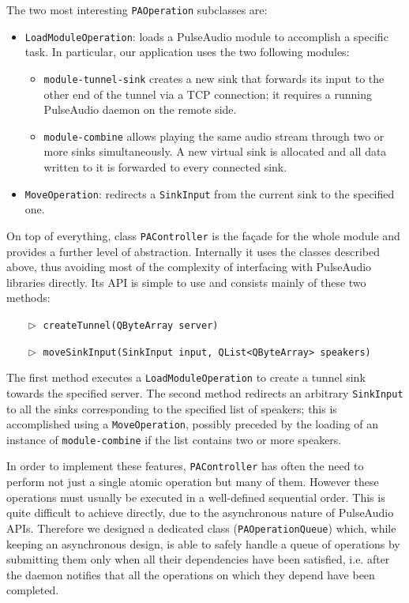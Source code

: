 \documentclass[conference]{IEEEtran}
\begin{document}
The two most interesting \texttt{PAOperation} subclasses are:
\begin{itemize}
	\item \texttt{LoadModuleOperation}: loads a PulseAudio module to accomplish a specific task. In particular, our application uses the two following modules:
	\begin{itemize}
		\item \texttt{module-tunnel-sink} creates a new sink that forwards its input to the other end of the tunnel via a TCP connection; it requires a running PulseAudio daemon on the remote side.
		\item \texttt{module-combine} allows playing the same audio stream through two or more sinks simultaneously. A new virtual sink is allocated and all data written to it is forwarded to every connected sink.
	\end{itemize}
	\item \texttt{MoveOperation}: redirects a \texttt{SinkInput} from the current sink to the specified one.
\end{itemize}

On top of everything, class \texttt{PAController} is the façade for the whole module and provides a further level of abstraction. Internally it uses the classes described above, thus avoiding most of the complexity of interfacing with PulseAudio libraries directly. Its API is simple to use and consists mainly of these two methods:
\begin{itemize}
\item[$\vartriangleright$] \texttt{createTunnel(QByteArray server)}
\item[$\vartriangleright$] \texttt{moveSinkInput(SinkInput input, QList<QByteArray> speakers)}
\end{itemize}
The first method executes a \texttt{LoadModuleOperation} to create a tunnel sink towards the specified server. The second method redirects an arbitrary \texttt{SinkInput} to all the sinks corresponding to the specified list of speakers; this is accomplished using a \texttt{MoveOperation}, possibly preceded by the loading of an instance of \texttt{module-combine} if the list contains two or more speakers.

In order to implement these features, \texttt{PAController} has often the need to perform not just a single atomic operation but many of them. However these operations must usually be executed in a well-defined sequential order. This is quite difficult to achieve directly, due to the asynchronous nature of PulseAudio APIs. Therefore we designed a dedicated class (\texttt{PAOperationQueue}) which, while keeping an asynchronous design, is able to safely handle a queue of operations by submitting them only when all their dependencies have been satisfied, i.e. after the daemon notifies that all the operations on which they depend have been completed.
\end{document}
